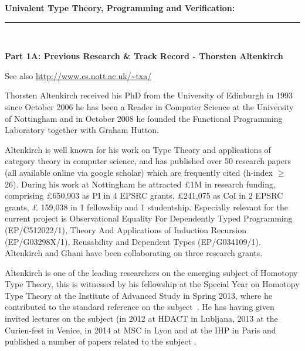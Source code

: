 \documentclass[a4paper,11pt]{article}
\begin{document}
\thispagestyle{plain}
\begin{center}
  {\Large {\bf Univalent Type Theory, Programming and Verification:}}\\[1ex] 

\vspace*{-0.1in}

  \rule{140mm}{.5mm}\\[2ex]
\end{center}

\noindent
{\bf \Large Part 1A: Previous Research \& Track Record - 
Thorsten Altenkirch}

\vspace{0.05in}


\noindent
See also \url{http://www.cs.nott.ac.uk/~txa/}

\vspace{0.05in}
Thorsten Altenkirch received his PhD from the University of
Edinburgh in 1993 since October 2006 he has been a Reader in
Computer Science at the University of Nottingham and in October
2008 he founded  the Functional Programming Laboratory together with
Graham Hutton.

Altenkirch is well known for his work on Type Theory and applications
of category theory in computer science, and has published over 50
research papers (all available online via google scholar) which are
frequently cited (h-index $\geq$ 26). During his work at Nottingham he attracted
\pounds 1M in research funding, comprising \pounds 650,903 as PI in 4
EPSRC grants, \pounds 241,075 as CoI in 2 EPSRC grants, \pounds
159,038 in 1 fellowship and 1 studentship. Especially relevant for the
current project is Observational Equality For Dependently Typed Programming
(EP/C512022/1), Theory And Applications of Induction Recursion (EP/G03298X/1),
Reusability and Dependent Types (EP/G034109/1). Altenkirch and Ghani have been  collaborating on
three research grants.

Altenkirch is one of the leading researchers on the emerging subject of Homotopy Type Theory,
this is witnessed by his fellowship at the Special Year on Homotopy
Type Theory at the Institute of Advanced Study in Spring 2013, where he contributed to the standard reference on the subject~\cite{hott-book}. 
He has 
having given invited lectures on the subject (in 2012 at HDACT in
Lubljana, 2013 at the Curien-fest in Venice, in 2014 at MSC in Lyon
and at the IHP in Paris and published a number of papers related to the subject 
\cite{altenkirch:extSetoids,alti:ott-conf,alti:csl12,alti:tlca13-hedberg}.
\end{document}
